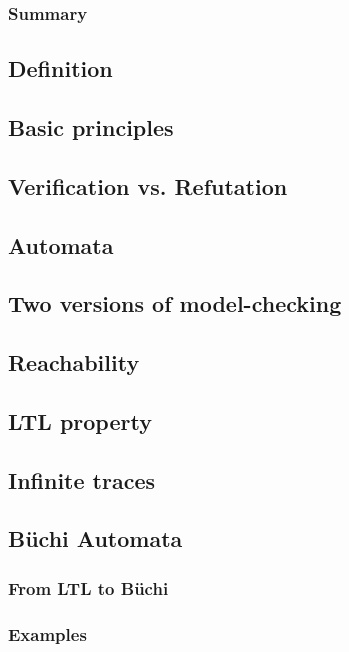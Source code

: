 \documentclass[12pt, a4paper]{book}
\begin{document}
  \subsubsection{Summary}
  \label{subs:Summary}
  \subsection{Definition}
  \label{sub:Definition}
  \subsection{Basic principles}
  \label{sub:Basic principles}
  \subsection{Verification vs. Refutation}
  \label{sub:Verification vs. Refutation}
  \subsection{Automata}
  \label{sub:Automata}
  \subsection{Two versions of model-checking}
  \label{sub:Two versions of model-checking}
  \subsection{Reachability}
  \label{sub:Reachability}
  \subsection{LTL property}
  \label{sub:LTL property}
  \subsection{Infinite traces}
  \label{sub:Infinite traces}
  \subsection{Büchi Automata}
  \label{sub:Büchi Automata}
  \subsubsection{From LTL to Büchi}
  \label{subs:From LTL to Büchi}
  \subsubsection{Examples}
  \label{subs:Examples}
\end{document}

